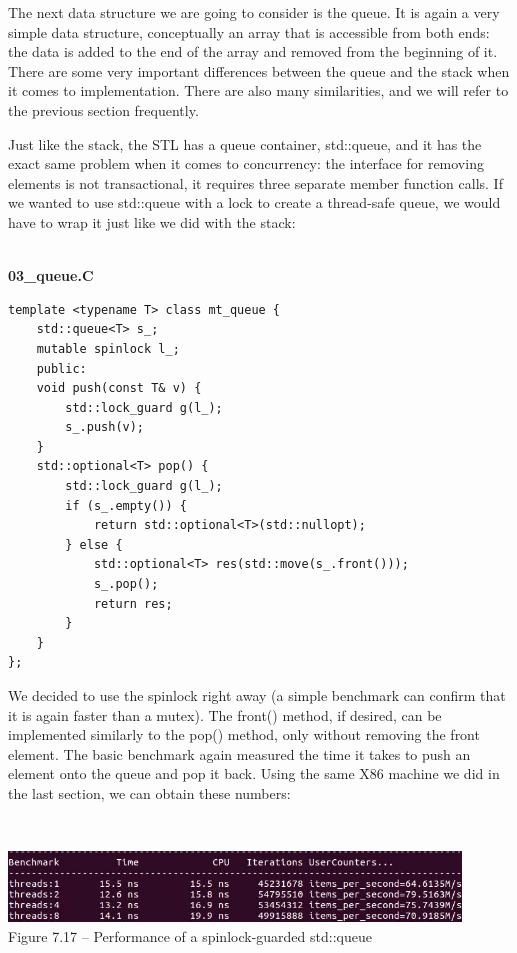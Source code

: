 
The next data structure we are going to consider is the queue. It is again a very simple data  structure, conceptually an array that is accessible from both ends: the data is added to the  end of the array and removed from the beginning of it. There are some very important  differences between the queue and the stack when it comes to implementation. There are  also many similarities, and we will refer to the previous section frequently. 

Just like the stack, the STL has a queue container, std::queue, and it has the exact  same problem when it comes to concurrency: the interface for removing elements is  not transactional, it requires three separate member function calls. If we wanted to use std::queue with a lock to create a thread-safe queue, we would have to wrap it just like we did with the stack:

\hspace*{\fill} \\ %
\noindent
\textbf{03\_queue.C}
\begin{lstlisting}[style=styleCXX]
template <typename T> class mt_queue {
	std::queue<T> s_;
	mutable spinlock l_;
	public:
	void push(const T& v) {
		std::lock_guard g(l_);
		s_.push(v);
	}
	std::optional<T> pop() {
		std::lock_guard g(l_);
		if (s_.empty()) {
			return std::optional<T>(std::nullopt);
		} else {
			std::optional<T> res(std::move(s_.front()));
			s_.pop();
			return res;
		}
	}
};
\end{lstlisting}

We decided to use the spinlock right away (a simple benchmark can confirm that it is again faster than a mutex). The front() method, if desired, can be implemented similarly to the pop() method, only without removing the front element. The basic benchmark again measured the time it takes to push an element onto the queue and pop it back. Using the same X86 machine we did in the last section, we can obtain these  numbers:

\hspace*{\fill} \\ %
\begin{center}
\includegraphics[width=0.9\textwidth]{content/2/chapter7/images/17.jpg}\\
Figure 7.17 – Performance of a spinlock-guarded std::queue
\end{center}

